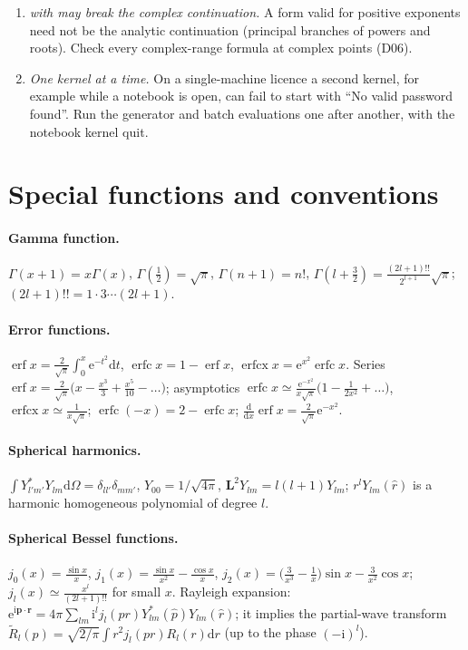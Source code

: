 \documentclass[11pt,a4paper]{article}
\numberwithin{equation}{section}
\theoremstyle{definition}
\theoremstyle{plain}
\theoremstyle{remark}
\numberwithin{algorithm}{section}
\newcommand{\vr}{\bm r}
\newcommand{\vp}{\bm p}
\newcommand{\vL}{\bm L}
\newcommand{\dd}{\mathrm{d}}
\newcommand{\ii}{\mathrm{i}}
\newcommand{\ee}{\mathrm{e}}
\newcommand{\erf}{\operatorname{erf}}
\newcommand{\erfc}{\operatorname{erfc}}
\newcommand{\erfcx}{\operatorname{erfcx}}
\begin{document}
\begin{enumerate}[leftmargin=1.5em,itemsep=3pt]
\item \emph{ with  may break the complex continuation.} A form valid for positive exponents need not be the analytic continuation (principal branches of powers and roots). Check every complex-range formula at complex points (D06).
\item \emph{One kernel at a time.} On a single-machine licence a second kernel, for example  while a notebook is open, can fail to start with ``No valid password found''. Run the generator and batch evaluations one after another, with the notebook kernel quit.
\end{enumerate}
\appendix
\section{Special functions and conventions}\label{app:special}
\paragraph{Gamma function.} $\Gamma(x+1)=x\Gamma(x)$, $\Gamma(\frac12)=\sqrt\pi$, $\Gamma(n+1)=n!$, $\Gamma(l+\frac32)=\frac{(2l+1)!!}{2^{l+1}}\sqrt\pi$; $(2l+1)!!=1\cdot3\cdots(2l+1)$.
\paragraph{Error functions.} $\erf x=\frac2{\sqrt\pi}\int_0^x\ee^{-t^2}\dd t$, $\erfc x=1-\erf x$, $\erfcx x=\ee^{x^2}\erfc x$.
Series $\erf x=\frac2{\sqrt\pi}\big(x-\frac{x^3}3+\frac{x^5}{10}-\dots\big)$; asymptotics $\erfc x\simeq\frac{\ee^{-x^2}}{x\sqrt\pi}\big(1-\frac1{2x^2}+\dots\big)$, $\erfcx x\simeq\frac{1}{x\sqrt\pi}$; $\erfc(-x)=2-\erfc x$; $\frac{\dd}{\dd x}\erf x=\frac{2}{\sqrt\pi}\ee^{-x^2}$.
\paragraph{Spherical harmonics.} $\int Y_{l'm'}^*Y_{lm}\dd\Omega=\delta_{ll'}\delta_{mm'}$, $Y_{00}=1/\sqrt{4\pi}$, $\vL^2Y_{lm}=l(l+1)Y_{lm}$; $r^lY_{lm}(\hat r)$ is a harmonic homogeneous polynomial of degree $l$.
\paragraph{Spherical Bessel functions.} $j_0(x)=\frac{\sin x}x$, $j_1(x)=\frac{\sin x}{x^2}-\frac{\cos x}x$, $j_2(x)=\big(\frac3{x^3}-\frac1x\big)\sin x-\frac{3}{x^2}\cos x$; $j_l(x)\simeq\frac{x^l}{(2l+1)!!}$ for small $x$.
Rayleigh expansion: $\ee^{\ii\vp\cdot\vr}=4\pi\sum_{lm}\ii^lj_l(pr)Y_{lm}^*(\hat p)Y_{lm}(\hat r)$; it implies the partial-wave transform $\tilde R_l(p)=\sqrt{2/\pi}\int r^2j_l(pr)R_l(r)\dd r$ (up to the phase $(-\ii)^l$).
\end{document}
